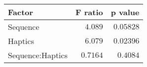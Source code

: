 \begin{tabular}{lrr}
\toprule
           Factor &  F ratio &   p value \\
\midrule
         Sequence &  $4.089$ & $0.05828$ \\
          Haptics &  $6.079$ & $0.02396$ \\
 Sequence:Haptics & $0.7164$ &  $0.4084$ \\
\bottomrule
\end{tabular}
